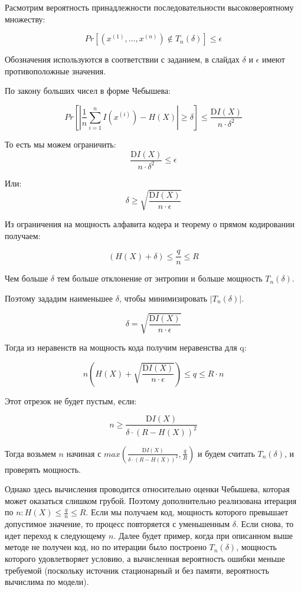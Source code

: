 \documentclass{article}
\begin{document}
Расмотрим вероятность принадлежности последовательности высоковероятному множеству:

\[Pr\left[(x^{(1)},\dots,x^{(n)}) \not\in T_n(\delta)\right] \leq \epsilon\]

Обозначения используются в соответствии с заданием, в слайдах $\delta$ и $\epsilon$ имеют противоположные значения.

По закону больших чисел в форме Чебышева:

\[Pr\left[\left|\frac{1}{n}\sum_{i=1}^{n} I\left(x^{(i)}\right) - H(X)\right| \geq \delta\right] \leq \frac{\text{D}I(X)}{n\cdot\delta^2}\]

То есть мы можем ограничить: \[\frac{\text{D}I(X)}{n\cdot\delta^2} \leq \epsilon\]

Или: \[\delta \geq \sqrt{\frac{\text{D}I(X)}{n\cdot\epsilon}}\]

Из ограничения на мощность алфавита кодера и теорему о прямом кодировании получаем:

\[(H(X)+\delta) \leq \frac{q}{n} \leq R\]

Чем больше $\delta$ тем больше отклонение от энтропии и больше мощность $T_n(\delta)$. 

Поэтому зададим наименьшее $\delta$, чтобы минимизировать $\left|T_n(\delta)\right|$.

\[\delta = \sqrt{\frac{\text{D}I(X)}{n\cdot\epsilon}}\]

Тогда из неравенств на мощность кода получим неравенства для q:

\[ n\left(H(X) + \sqrt{\frac{\text{D}I(X)}{n\cdot\epsilon}}\right) \leq q \leq R\cdot n\]

Этот отрезок не будет пустым, если:

\[n \geq \frac{\text{D}I(X)}{\delta\cdot\left(R-H(X)\right)^2} \]

Тогда возьмем $n$ начиная с $max\left(\frac{\text{D}I(X)}{\delta\cdot\left(R-H(X)\right)^2}, \frac{q}{R}\right)$ и будем считать $T_n(\delta)$, и проверять мощность.

Однако здесь вычисления проводится относительно оценки Чебышева, которая может оказаться слишком грубой. Поэтому дополнительно реализована итерация по $n: H(X) \leq \frac{q}{n} \leq R$. Если мы получаем код, мощность которого превышает допустимое значение, то процесс повторяется с уменьшенным $\delta$. Если снова, то идет переход к следующему $n$. Далее будет пример, когда при описанном выше методе не получен код, но по итерации было построено $T_n(\delta)$, мощность которого удовлетворяет условию, а вычисленная вероятность ошибки меньше требуемой (поскольку источник стационарный и без памяти, вероятность вычислима по модели).
\end{document}
